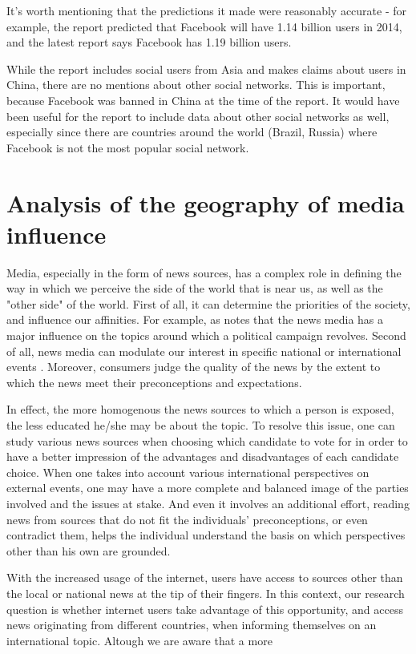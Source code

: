 \documentclass{acm_proc_10ptArticle-sp}
\begin{document}
It’s worth mentioning that the predictions it made were reasonably accurate - for example, the report predicted that Facebook will have 1.14 billion users in 2014, and the latest report says Facebook has 1.19 billion users.

While the report includes social users from Asia and makes claims about users in China, there are no mentions about other social networks. This is important, because Facebook was banned in China at the time of the report. It would have been useful for the report to include data about other social networks as well, especially since there are countries around the world (Brazil, Russia) where Facebook is not the most popular social network.


\section{Analysis of the geography of media influence}

Media, especially in the form of news sources, has a complex role in defining the way in which we perceive the side of the world that is near us, as well as the "other side" of the world. First of all, it can determine the priorities of the society, and influence our affinities. For example, as   notes that the news media has a major influence on the topics around which a political campaign revolves. Second of all, news media can modulate our interest in specific national or international events \cite{wanta2004agenda}. Moreover, consumers judge the quality of the news by the extent to which the news meet their preconceptions and expectations\cite{gentzkow2005media}. 

In effect, the more homogenous the news sources to which a person is exposed, the less educated he/she may be about the topic. To resolve this issue, one can study various news sources when choosing which candidate to vote for in order to have a better impression of the advantages and disadvantages of each candidate choice. When one takes into account various international perspectives on external events, one may have a more complete and balanced image of the parties involved and the issues at stake. And even it involves an additional effort, reading news from sources that do not fit the individuals' preconceptions, or even contradict them, helps the individual understand the basis on which perspectives other than his own are grounded.

With the increased usage of the internet, users have access to sources other than the local or national news at the tip of their fingers. In this context, our research question is whether internet users take advantage of this opportunity, and access news originating from different countries, when informing themselves on an international topic. Altough we are aware that a more 
\end{document}
